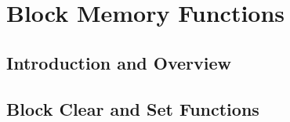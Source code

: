 
\chapter{Block Memory Functions}

\label{cbmf0}

\section{Introduction and Overview}
\label{cbmf0:siov0}


\section{Block Clear and Set Functions}
\label{cbmf0:sbcs0}


